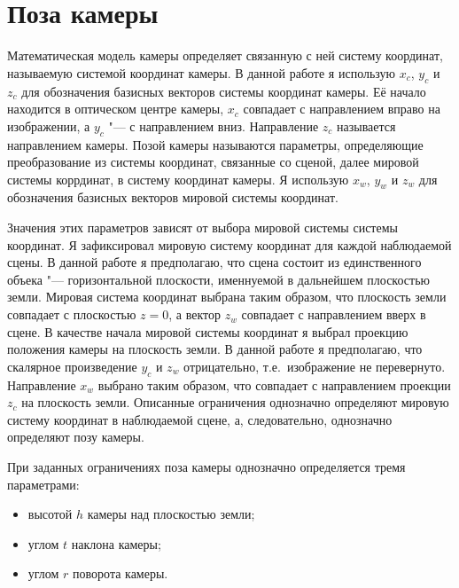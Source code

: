 \def\slantfrac#1#2{ \hspace{3pt}\!^{#1}\!\!\hspace{1pt}/
	\hspace{2pt}\!\!_{#2}\!\hspace{3pt}
} %

\iffalse
\chapter{Определение позы камеры в сцене} \label{chapt1}
\fi

\section{Поза камеры}
Математическая модель камеры определяет связанную с ней систему координат, называемую системой координат камеры. В данной работе я использую $x_c$, $y_c$ и $z_c$ для обозначения базисных векторов системы координат камеры. Её начало находится в оптическом центре камеры, $x_c$ совпадает с направлением вправо на изображении, а $y_c$ "--- с направлением вниз. Направление $z_c$ называется направлением камеры. Позой камеры называются параметры, определяющие преобразование из системы координат, связанные со сценой, далее мировой системы коррдинат, в систему координат камеры. Я использую $x_w$, $y_w$ и $z_w$ для обозначения базисных векторов мировой системы координат.

Значения этих параметров зависят от выбора мировой системы системы координат. Я зафиксировал мировую систему координат для каждой наблюдаемой сцены. В данной работе я предполагаю, что сцена состоит из единственного объека "--- горизонтальной плоскости, именнуемой в дальнейшем плоскостью земли. Мировая система координат выбрана таким образом, что плоскость земли совпадает с плоскостью $z=0$, а вектор $z_w$ совпадает с направлением вверх в сцене. В качестве начала мировой системы координат я выбрал проекцию положения камеры на плоскость земли. В данной работе я предполагаю, что скалярное произведение $y_c$ и $z_w$ отрицательно, т.е.~изображение не перевернуто. Направление $x_w$ выбрано таким образом, что совпадает с направлением проекции $z_c$ на плоскость земли.  Описанные ограничения однозначно определяют мировую систему координат в наблюдаемой сцене, а, следовательно, однозначно определяют позу камеры.

При заданных ограничениях поза камеры однозначно определяется тремя параметрами:
\begin{itemize}
	\item высотой $h$ камеры над плоскостью земли;
	\item углом $t$ наклона камеры;
	\item углом $r$ поворота камеры.
\end{itemize}

